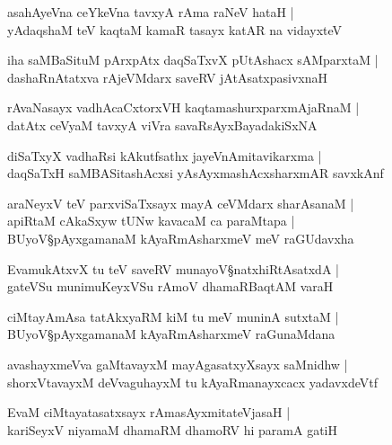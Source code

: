 \begin{shloka}
asahAyeVna ceYkeVna tavxyA rAma raNeV hataH |\\
yAdaqshaM teV kaqtaM kamaR tasayx katAR na vidayxteV 
\end{shloka}

\begin{shloka}
iha saMBaSituM pArxpAtx daqSaTxvX pUtAshacx sAMparxtaM |\\
dashaRnAtatxva rAjeVMdarx saveRV jAtAsatxpasivxnaH 
\end{shloka}

\begin{shloka}
rAvaNasayx vadhAcaCxtorxVH kaqtamashurxparxmAjaRnaM |\\
datAtx ceVyaM tavxyA viVra savaRsAyxBayadakiSxNA
\end{shloka}

\begin{shloka}
diSaTxyX vadhaRsi kAkutfsathx jayeVnAmitavikarxma |\\
daqSaTxH saMBASitashAcxsi yAsAyxmashAcxsharxmAR savxkAnf 
\end{shloka}

\begin{shloka}
araNeyxV teV parxviSaTxsayx mayA ceVMdarx sharAsanaM |\\
apiRtaM cAkaSxyw tUNw kavacaM ca paraMtapa |\\
BUyoV\S pAyxgamanaM kAyaRmAsharxmeV meV raGUdavxha 
\end{shloka}

\begin{shloka}
EvamukAtxvX tu teV saveRV munayoV\S natxhiRtAsatxdA |\\
gateVSu munimuKeyxVSu rAmoV dhamaRBaqtAM varaH 
\end{shloka}

\begin{shloka}
ciMtayAmAsa tatAkxyaRM kiM tu meV muninA sutxtaM |\\
BUyoV\S pAyxgamanaM kAyaRmAsharxmeV raGunaMdana
\end{shloka}

\begin{shloka}
avashayxmeVva gaMtavayxM mayAgasatxyXsayx saMnidhw |\\
shorxVtavayxM deVvaguhayxM tu kAyaRmanayxcacx yadavxdeVtf
\end{shloka}

\begin{shloka}
EvaM ciMtayatasatxsayx rAmasAyxmitateVjasaH |\\
kariSeyxV niyamaM dhamaRM dhamoRV hi paramA gatiH 
\end{shloka}

